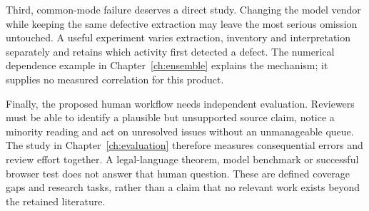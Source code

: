 Third, common-mode failure deserves a direct study. Changing the model vendor
while keeping the same defective extraction may leave the most serious omission
untouched. A useful experiment varies extraction, inventory and interpretation
separately and retains which activity first detected a defect. The numerical
dependence example in Chapter~\ref{ch:ensemble} explains the mechanism; it supplies
no measured correlation for this product.

Finally, the proposed human workflow needs independent evaluation. Reviewers
must be able to identify a plausible but unsupported source claim, notice a
minority reading and act on unresolved issues without an unmanageable queue.
The study in Chapter~\ref{ch:evaluation} therefore measures consequential errors
and review effort together. A legal-language theorem, model benchmark or
successful browser test does not answer that human question. These are defined
coverage gaps and research tasks, rather than a claim that no relevant work
exists beyond the retained literature.
